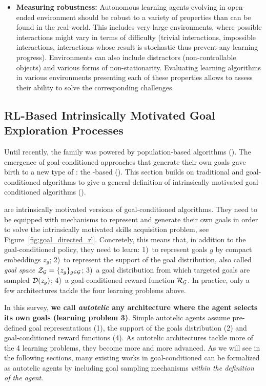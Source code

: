 \begin{itemize}
    \item
    \textbf{Measuring robustness:} Autonomous learning agents evolving in open-ended environment should be robust to a variety of properties than can be found in the real-world. This includes very large environments, where possible interactions might vary in terms of difficulty (trivial interactions, impossible interactions, interactions whose result is stochastic thus prevent any learning progress). Environments can also include distractors (\eg non-controllable objects) and various forms of non-stationarity. Evaluating learning algorithms in various environments presenting each of these properties allows to assess their ability to solve the corresponding challenges.
\end{itemize}

 
\subsection{RL-Based Intrinsically Motivated Goal Exploration Processes}
\label{sec:gcimgep_solutions}
Until recently, the \imgep family was powered by population-based algorithms (\popimgep). The emergence of goal-conditioned \rl approaches that generate their own goals gave birth to a new type of \imgeps: the \rl-based \imgeps (\rlimgep). This section builds on traditional \rl and goal-conditioned \rl algorithms to give a general definition of intrinsically motivated goal-conditioned \rl algorithms (\rlimgep).

\rlimgep are intrinsically motivated versions of goal-conditioned \rl algorithms. They need to be equipped with mechanisms to represent and generate their own goals in order to solve the intrinsically motivated skills acquisition problem, see Figure~\ref{fig:goal_directed_rl}. Concretely, this means that, in addition to the goal-conditioned policy, they need to learn: 1)~to represent goals $g$ by compact embeddings $z_g$; 2)~to represent the support of the goal distribution, also called \textit{goal space} $\mathcal{Z}_{\mathcal{G}}=\{z_g\}_{g\in\mathcal{G}}$; 3)~a goal distribution from which targeted goals are sampled $\mathcal{D}(z_g)$; 4)~a goal-conditioned reward function $\mathcal{R}_{\mathcal{G}}$. In practice, only a few architectures tackle the four learning problems above. 

In this survey, \textbf{we call \textit{autotelic} any architecture where the agent selects its own goals (learning problem 3)}. Simple autotelic agents assume pre-defined goal representations (1), the support of the goals distribution (2) and goal-conditioned reward functions (4). As autotelic architectures tackle more of the 4 learning problems, they become more and more advanced. As we will see in the following sections, many existing works in goal-conditioned \rl can be formalized as autotelic agents by including goal sampling mechanisms \textit{within the definition of the agent}. 

